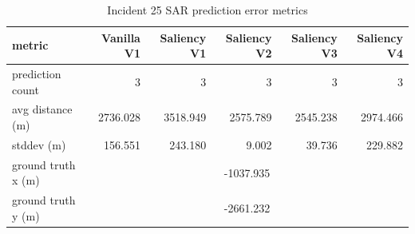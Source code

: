 \begin{table}[ht]
\centering
\caption{Incident 25 SAR prediction error metrics}
\label{tab:sar-incident-25}
\begin{tabular}{lrrrrr}
\hline
metric & Vanilla V1 & Saliency V1 & Saliency V2 & Saliency V3 & Saliency V4 \\
\hline
prediction count & 3 & 3 & 3 & 3 & 3 \\
avg distance (m) & 2736.028 & 3518.949 & 2575.789 & 2545.238 & 2974.466 \\
stddev (m) & 156.551 & 243.180 & 9.002 & 39.736 & 229.882 \\
ground truth x (m) & \multicolumn{5}{c}{-1037.935} \\
ground truth y (m) & \multicolumn{5}{c}{-2661.232} \\
\hline
\end{tabular}
\end{table}

